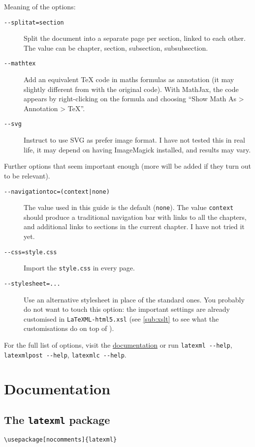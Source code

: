 \documentclass[a4paper]{article}
\theoremstyle{definition}
\begin{document}
Meaning of the options:
\begin{description}
  \item[\texttt{{-}{-}splitat=section}] Split the document into a separate \HTML{} page per section, linked to each other. The value can be chapter, section, subsection, subsubsection.
  \item[\texttt{{-}{-}mathtex}] Add an equivalent \TeX{} code in maths formulas as annotation (it may slightly different from with the original code). With MathJax, the code appears by right-clicking on the formula and choosing ``Show Math As > Annotation > TeX''.
  \item[\texttt{{-}{-}svg}] Instruct \LaTeXML{} to use SVG as prefer image format. I have not tested this in real life, it may depend on having ImageMagick installed, and results may vary.
\end{description}
Further options that seem important enough (more will be added if they turn out to be relevant).
\begin{description}
  \item[\texttt{{-}{-}navigationtoc=(context|none)}] The value used in this guide is the default (\verb|none|). The value \verb|context| should produce a traditional navigation bar with links to all the chapters, and additional links to sections in the current chapter. I have not tried it yet.
  \item[\texttt{{-}{-}css=style.css}] Import the \CSS{} \verb|style.css| in every page.
  \item[\texttt{{-}{-}stylesheet=...}] Use an alternative \XSLT{} stylesheet in place of the standard ones. You probably do not want to touch this option: the important settings are already customised in \verb|LaTeXML-html5.xsl| (see \autoref{sub:xslt} to see what the customisations do on top of \LaTeXML{}).
\end{description}
For the full list of options, visit the \href{https://dlmf.nist.gov/LaTeXML/docs.html}{\LaTeXML{} documentation} or run \verb|latexml --help|, \verb|latexmlpost --help|, \verb|latexmlc --help|.

\section{Documentation}

\subsection{The \texttt{latexml} package}
\begin{lstlisting}[style=latexml,caption={Import \texttt{latexml} in the preamble}]
  \usepackage[nocomments]{latexml}
\end{lstlisting}
\end{document}
